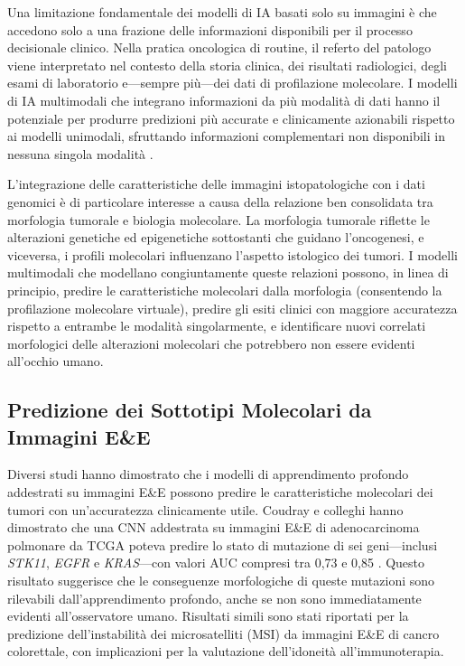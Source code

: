 Una limitazione fondamentale dei modelli di IA basati solo su immagini è che accedono solo a una frazione delle informazioni disponibili per il processo decisionale clinico. Nella pratica oncologica di routine, il referto del patologo viene interpretato nel contesto della storia clinica, dei risultati radiologici, degli esami di laboratorio e---sempre più---dei dati di profilazione molecolare. I modelli di IA multimodali che integrano informazioni da più modalità di dati hanno il potenziale per produrre predizioni più accurate e clinicamente azionabili rispetto ai modelli unimodali, sfruttando informazioni complementari non disponibili in nessuna singola modalità \cite{song2023}.

L'integrazione delle caratteristiche delle immagini istopatologiche con i dati genomici è di particolare interesse a causa della relazione ben consolidata tra morfologia tumorale e biologia molecolare. La morfologia tumorale riflette le alterazioni genetiche ed epigenetiche sottostanti che guidano l'oncogenesi, e viceversa, i profili molecolari influenzano l'aspetto istologico dei tumori. I modelli multimodali che modellano congiuntamente queste relazioni possono, in linea di principio, predire le caratteristiche molecolari dalla morfologia (consentendo la profilazione molecolare virtuale), predire gli esiti clinici con maggiore accuratezza rispetto a entrambe le modalità singolarmente, e identificare nuovi correlati morfologici delle alterazioni molecolari che potrebbero non essere evidenti all'occhio umano.

\subsection{Predizione dei Sottotipi Molecolari da Immagini E\&E}

Diversi studi hanno dimostrato che i modelli di apprendimento profondo addestrati su immagini E\&E possono predire le caratteristiche molecolari dei tumori con un'accuratezza clinicamente utile. Coudray e colleghi hanno dimostrato che una CNN addestrata su immagini E\&E di adenocarcinoma polmonare da TCGA poteva predire lo stato di mutazione di sei geni---inclusi \emph{STK11}, \emph{EGFR} e \emph{KRAS}---con valori AUC compresi tra 0,73 e 0,85 \cite{coudray2018}. Questo risultato suggerisce che le conseguenze morfologiche di queste mutazioni sono rilevabili dall'apprendimento profondo, anche se non sono immediatamente evidenti all'osservatore umano. Risultati simili sono stati riportati per la predizione dell'instabilità dei microsatelliti (MSI) da immagini E\&E di cancro colorettale, con implicazioni per la valutazione dell'idoneità all'immunoterapia.

